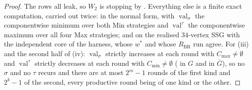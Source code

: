 \documentclass[11pt]{article}
\theoremstyle{plain}
\theoremstyle{definition}
\DeclareMathOperator{\val}{val}
\begin{document}
\begin{proof}
The rows all leak, so $W_2$ is stopping by .  Everything
else is a finite exact computation, carried out twice: in the normal form,
with $\val_\sigma$ the componentwise minimum over both Min strategies and
$\val^{\tau}$ the componentwise maximum over all four Max strategies; and on
the realised $34$-vertex SSG with the independent core of the harness, whose
$w^{\ast}$ and whose $R_{\mathrm{BR}}$ run agree.  For (iii) and the second
half of (iv): $\val_\sigma$ strictly increases at each round with
$C_{\max}\ne\emptyset$ and $\val^{\tau}$ strictly decreases at each round with
$C_{\min}\ne\emptyset$ ( in $G$ and in $\bar G$), so no
$\sigma$ and no $\tau$ recurs and there are at most $2^{m}-1$ rounds of the
first kind and $2^{k}-1$ of the second, every productive round being of one
kind or the other.
\end{proof}
\end{document}
